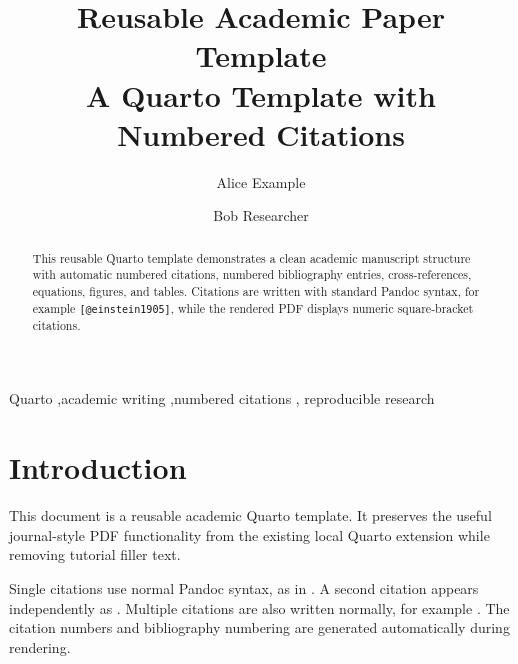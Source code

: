 \documentclass[
  number,
  preprint]{elsarticle}
\begin{document}
\begin{frontmatter}
\title{Reusable Academic Paper Template \\\large{A Quarto Template with
Numbered Citations} }
\author[1]{Alice Example%
%
}
\author[2]{Bob Researcher%
%
}




        
\begin{abstract}
This reusable Quarto template demonstrates a clean academic manuscript
structure with automatic numbered citations, numbered bibliography
entries, cross-references, equations, figures, and tables. Citations are
written with standard Pandoc syntax, for example
\texttt{{[}@einstein1905{]}}, while the rendered PDF displays numeric
square-bracket citations.
\end{abstract}





\begin{keyword}
    Quarto \sep academic writing \sep numbered citations \sep 
    reproducible research
\end{keyword}
\end{frontmatter}
    

\section{Introduction}\label{sec-introduction}

This document is a reusable academic Quarto template. It preserves the
useful journal-style PDF functionality from the existing local Quarto
extension while removing tutorial filler text.

Single citations use normal Pandoc syntax, as in \citep{einstein1905}. A
second citation appears independently as \citep{shannon1948}. Multiple
citations are also written normally, for example
\citep{einstein1905, shannon1948, knuth1984}. The citation numbers and
bibliography numbering are generated automatically during rendering.
\end{document}
